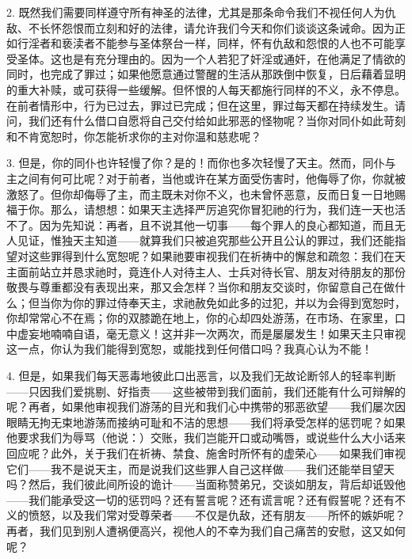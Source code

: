 2. 既然我们需要同样遵守所有神圣的法律，尤其是那条命令我们不视任何人为仇敌、不长怀怨恨而立刻和好的法律，请允许我们今天和你们谈谈这条诫命。因为正如行淫者和亵渎者不能参与圣体祭台一样，同样，怀有仇敌和怨恨的人也不可能享受圣体。这也是有充分理由的。因为一个人若犯了奸淫或通奸，在他满足了情欲的同时，也完成了罪过；如果他愿意通过警醒的生活从那跌倒中恢复，日后藉着显明的重大补赎，或可获得一些缓解。但怀恨的人每天都施行同样的不义，永不停息。在前者情形中，行为已过去，罪过已完成；但在这里，罪过每天都在持续发生。请问，我们还有什么借口自愿将自己交付给如此邪恶的怪物呢？当你对同仆如此苛刻和不肯宽恕时，你怎能祈求你的主对你温和慈悲呢？\par

3. 但是，你的同仆也许轻慢了你？是的！而你也多次轻慢了天主。然而，同仆与主之间有何可比呢？对于前者，当他或许在某方面受伤害时，他侮辱了你，你就被激怒了。但你却侮辱了主，而主既未对你不义，也未曾怀恶意，反而日复一日地赐福于你。那么，请想想：如果天主选择严厉追究你冒犯祂的行为，我们连一天也活不了。因为先知说：再者，且不说其他一切事——每个罪人的良心都知道，而且无人见证，惟独天主知道——就算我们只被追究那些公开且公认的罪过，我们还能指望对这些罪得到什么宽恕呢？如果祂要审视我们在祈祷中的懈怠和疏忽：我们在天主面前站立并恳求祂时，竟连仆人对待主人、士兵对待长官、朋友对待朋友的那份敬畏与尊重都没有表现出来，那又会怎样？当你和朋友交谈时，你留意自己在做什么；但当你为你的罪过侍奉天主，求祂赦免如此多的过犯，并以为会得到宽恕时，你却常常心不在焉；你的双膝跪在地上，你的心却四处游荡，在市场、在家里，口中虚妄地喃喃自语，毫无意义！这并非一次两次，而是屡屡发生！如果天主只审视这一点，你认为我们能得到宽恕，或能找到任何借口吗？我真心认为不能！\par

4. 但是，如果我们每天恶毒地彼此口出恶言，以及我们无故论断邻人的轻率判断——只因我们爱挑剔、好指责——这些被带到我们面前，我们还能有什么可辩解的呢？再者，如果他审视我们游荡的目光和我们心中携带的邪恶欲望——我们屡次因眼睛无拘无束地游荡而接纳可耻和不洁的思想——我们将承受怎样的惩罚呢？如果他要求我们为辱骂（他说：）交账，我们岂能开口或动嘴唇，或说些什么大小话来回应呢？此外，关于我们在祈祷、禁食、施舍时所怀有的虚荣心——如果我们审视它们——我不是说天主，而是说我们这些罪人自己这样做——我们还能举目望天吗？然后，我们彼此间所设的诡计——当面称赞弟兄，交谈如朋友，背后却诋毁他——我们能承受这一切的惩罚吗？还有誓言呢？还有谎言呢？还有假誓呢？还有不义的愤怒，以及我们常对受尊荣者——不仅是仇敌，还有朋友——所怀的嫉妒呢？再者，我们见到别人遭祸便高兴，视他人的不幸为我们自己痛苦的安慰，这又如何呢？\par

